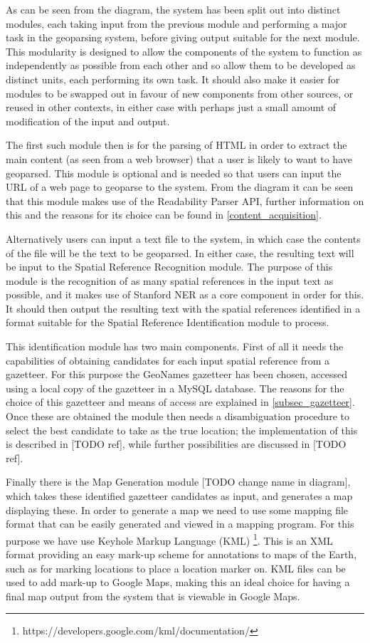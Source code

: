 \documentclass[12pt, a4paper]{report}
\begin{document}
As can be seen from the diagram, the system has been split out into distinct modules, each taking input from the previous module and performing a major task in the geoparsing system, before giving output suitable for the next module. This modularity is designed to allow the components of the system to function as independently as possible from each other and so allow them to be developed as distinct units, each performing its own task. It should also make it easier for modules to be swapped out in favour of new components from other sources, or reused in other contexts, in either case with perhaps just a small amount of modification of the input and output.

The first such module then is for the parsing of HTML in order to extract the main content (as seen from a web browser) that a user is likely to want to have geoparsed. This module is optional and is needed so that users can input the URL of a web page to geoparse to the system. From the diagram it can be seen that this module makes use of the Readability Parser API, further information on this and the reasons for its choice can be found in \ref{content_acquisition}.

Alternatively users can input a text file to the system, in which case the contents of the file will be the text to be geoparsed. In either case, the resulting text will be input to the Spatial Reference Recognition module. The purpose of this module is the recognition of as many spatial references in the input text as possible, and it makes use of Stanford NER as a core component in order for this. It should then output the resulting text with the spatial references identified in a format suitable for the Spatial Reference Identification module to process.

This identification module has two main components. First of all it needs the capabilities of obtaining candidates for each input spatial reference from a gazetteer.  For this purpose the GeoNames gazetteer has been chosen, accessed using a local copy of the gazetteer in a MySQL database. The reasons for the choice of this gazetteer and means of access are explained in \ref{subsec_gazetteer}. Once these are obtained the module then needs a disambiguation procedure to select the best candidate to take as the true location; the implementation of this is described in [TODO ref], while further possibilities are discussed in [TODO ref].

Finally there is the Map Generation module [TODO change name in diagram], which takes these identified gazetteer candidates as input, and generates a map displaying these. In order to generate a map we need to use some mapping file format that can be easily generated and viewed in a mapping program. For this purpose we have use Keyhole Markup Language (KML) \footnote{https://developers.google.com/kml/documentation/}. This is an XML format providing an easy mark-up scheme for annotations to maps of the Earth, such as for marking locations to place a location marker on. KML files can be used to add mark-up to Google Maps, making this an ideal choice for having a final map output from the system that is viewable in Google Maps.
\end{document}
